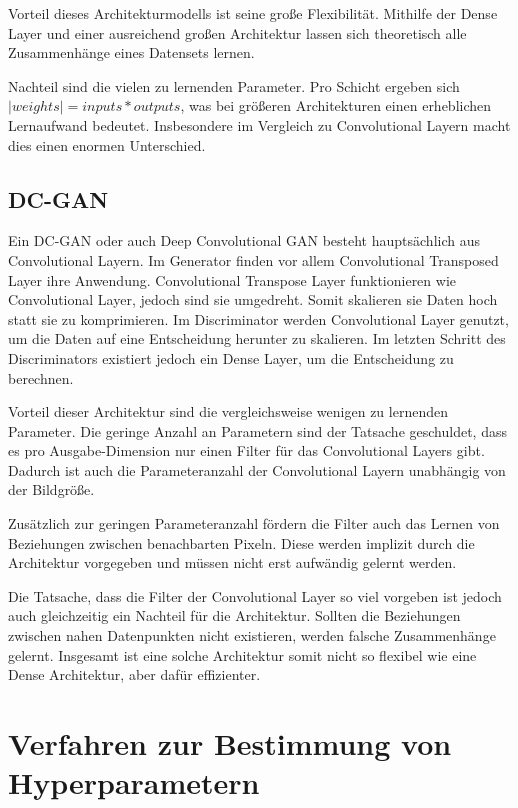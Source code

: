 Vorteil dieses Architekturmodells ist seine große Flexibilität.
Mithilfe der Dense Layer und einer ausreichend großen Architektur lassen sich theoretisch alle Zusammenhänge eines Datensets lernen.

Nachteil sind die vielen zu lernenden Parameter.
Pro Schicht ergeben sich $|weights| = inputs * outputs$, was bei größeren Architekturen einen erheblichen Lernaufwand bedeutet.
Insbesondere im Vergleich zu Convolutional Layern macht dies einen enormen Unterschied.

\subsection{DC-GAN}
Ein DC-GAN oder auch Deep Convolutional GAN besteht hauptsächlich aus Convolutional Layern.
Im Generator finden vor allem Convolutional Transposed Layer ihre Anwendung.
Convolutional Transpose Layer funktionieren wie Convolutional Layer, jedoch sind sie umgedreht.
Somit skalieren sie Daten hoch statt sie zu komprimieren.
Im Discriminator werden Convolutional Layer genutzt, um die Daten auf eine Entscheidung herunter zu skalieren.
Im letzten Schritt des Discriminators existiert jedoch ein Dense Layer, um die Entscheidung zu berechnen.
\newline

Vorteil dieser Architektur sind die vergleichsweise wenigen zu lernenden Parameter.
Die geringe Anzahl an Parametern sind der Tatsache geschuldet, dass es pro Ausgabe-Dimension nur einen Filter für das Convolutional Layers gibt.
Dadurch ist auch die Parameteranzahl der Convolutional Layern unabhängig von der Bildgröße.

Zusätzlich zur geringen Parameteranzahl fördern die Filter auch das Lernen von Beziehungen  zwischen benachbarten Pixeln.
Diese werden implizit durch die Architektur vorgegeben und müssen nicht erst aufwändig gelernt werden.
\newline

Die Tatsache, dass die Filter der Convolutional Layer so viel vorgeben ist jedoch auch gleichzeitig ein Nachteil für die Architektur.
Sollten die Beziehungen zwischen nahen Datenpunkten nicht existieren, werden falsche Zusammenhänge gelernt.
Insgesamt ist eine solche Architektur somit nicht so flexibel wie eine Dense Architektur, aber dafür effizienter.

\section{Verfahren zur Bestimmung von Hyperparametern}
\label{chapter:verfahren-bestimmung-hyperparameter}

